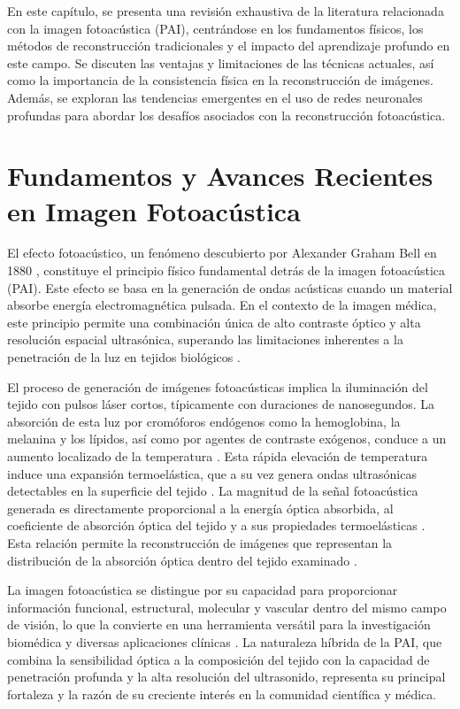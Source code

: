 En este capítulo, se presenta una revisión exhaustiva de la literatura relacionada con la imagen fotoacústica (PAI), centrándose en los fundamentos físicos, los métodos de reconstrucción tradicionales y el impacto del aprendizaje profundo en este campo. Se discuten las ventajas y limitaciones de las técnicas actuales, así como la importancia de la consistencia física en la reconstrucción de imágenes. Además, se exploran las tendencias emergentes en el uso de redes neuronales profundas para abordar los desafíos asociados con la reconstrucción fotoacústica.

\section{Fundamentos y Avances Recientes en Imagen Fotoacústica}

El efecto fotoacústico, un fenómeno descubierto por Alexander Graham Bell en 1880 \cite{bell_1880}, constituye el principio físico fundamental detrás de la imagen fotoacústica (PAI). Este efecto se basa en la generación de ondas acústicas cuando un material absorbe energía electromagnética pulsada. En el contexto de la imagen médica, este principio permite una combinación única de alto contraste óptico y alta resolución espacial ultrasónica, superando las limitaciones inherentes a la penetración de la luz en tejidos biológicos \cite{recent_advances_2025a}.

El proceso de generación de imágenes fotoacústicas implica la iluminación del tejido con pulsos láser cortos, típicamente con duraciones de nanosegundos. La absorción de esta luz por cromóforos endógenos como la hemoglobina, la melanina y los lípidos, así como por agentes de contraste exógenos, conduce a un aumento localizado de la temperatura \cite{recent_advances_2025a}. Esta rápida elevación de temperatura induce una expansión termoelástica, que a su vez genera ondas ultrasónicas detectables en la superficie del tejido \cite{recent_advances_2025a}. La magnitud de la señal fotoacústica generada es directamente proporcional a la energía óptica absorbida, al coeficiente de absorción óptica del tejido y a sus propiedades termoelásticas \cite{recent_advances_2025a}. Esta relación permite la reconstrucción de imágenes que representan la distribución de la absorción óptica dentro del tejido examinado \cite{recent_advances_2025a}.

La imagen fotoacústica se distingue por su capacidad para proporcionar información funcional, estructural, molecular y vascular dentro del mismo campo de visión, lo que la convierte en una herramienta versátil para la investigación biomédica y diversas aplicaciones clínicas \cite{dual_modal_2024}. La naturaleza híbrida de la PAI, que combina la sensibilidad óptica a la composición del tejido con la capacidad de penetración profunda y la alta resolución del ultrasonido, representa su principal fortaleza y la razón de su creciente interés en la comunidad científica y médica.


